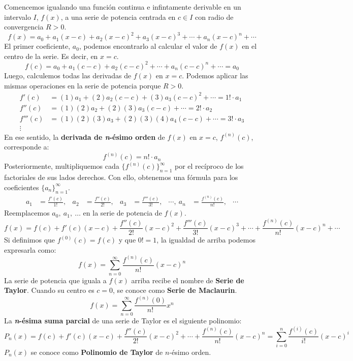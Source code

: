 \documentclass[12pt]{article}
\begin{document}
Comencemos igualando una función continua e infintamente derivable en un intervalo $I$, $f(x)$, a una serie de potencia centrada en $c \in I$ con radio de convergencia $R > 0$.
\[
  f(x) = a_{0} + a_{1}(x - c) + a_{2}(x - c)^{2} + a_{3}(x - c)^{3} + \cdots + a_{n}(x - c)^{n} + \cdots
\]
El primer coeficiente, $a_{0}$, podemos encontrarlo al calcular el valor de $f(x)$ en el centro de la serie. Es decir, en $x = c$.
\[
  f(c) = a_{0} + a_{1}(c - c) + a_{2}(c - c)^{2} + \cdots + a_{n}(c - c)^{n} + \cdots = a_{0}
\]
Luego, calculemos todas las derivadas de $f(x)$ en $x = c$. Podemos aplicar las mismas operaciones en la serie de potencia porque $R > 0$.
\begin{align*}
  f'(c) &= (1) a_{1} + (2) a_{2}(c - c) + (3) a_{3}(c - c)^{2} + \cdots = 1! \cdot a_{1} \\
  f''(c) &= (1) (2) a_{2} + (2) (3) a_{3} (c - c) + \cdots = 2! \cdot a_{2} \\
  f'''(c) &= (1) (2) (3) a_{3} + (2) (3) (4) a_{4}(c - c) + \cdots = 3! \cdot a_{3} \\
  \vdots
\end{align*}
En ese sentido, la \textbf{derivada de \textit{n}-ésimo orden} de $f(x)$ en $x = c$, $f^{(n)}(c)$, corresponde a:
\[
  f^{(n)}(c) = n! \cdot a_{n}
\]
Posteriormente, multipliquemos cada $\{f^{(n)}(c)\}_{n = 1}^{\infty}$ por el recíproco de los factoriales de sus lados derechos. Con ello, obtenemos una fórmula para los coeficientes $\{a_{n}\}_{n = 1}^{\infty}$.
\begin{align*}
  a_{1} &= \frac{f'(c)}{1!}, &
  a_{2} &= \frac{f''(c)}{2!}, &
  a_{3} &= \frac{f'''(c)}{3!}, &
  \cdots, \
  a_{n} &= \frac{f^{(n)}(c)}{n!}, &
  \cdots
\end{align*}
Reemplacemos $a_{0}, \ a_{1}, \ \ldots$ en la serie de potencia de $f(x)$.
\[
  f(x) = f(c) + f'(c)(x - c) + \frac{f''(c)}{2!}(x - c)^{2} + \frac{f'''(c)}{3!}(x - c)^{3} + \cdots
         + \frac{f^{(n)}(c)}{n!}(x - c)^{n} + \cdots
\]
Si definimos que $f^{(0)}(c) = f(c)$ y que $0! = 1$, la igualdad de arriba podemos expresarla como:
\[
  f(x) = \sum_{n = 0}^{\infty} \frac{f^{(n)}(c)}{n!}(x - c)^{n}
\]
La serie de potencia que iguala a $f(x)$ arriba recibe el nombre de \textbf{Serie de Taylor}. Cuando su centro es $c = 0$, se conoce como \textbf{Serie de Maclaurin}.
\[
  f(x) = \sum_{n = 0}^{\infty} \frac{f^{(n)}(0)}{n!} x^{n}
\]
La \textbf{\textit{n}-ésima suma parcial} de una serie de Taylor es el siguiente polinomio:
\[
  P_{n}(x) = f(c) + f'(c)(x - c) + \frac{f''(c)}{2!}(x - c)^{2} + \cdots + \frac{f^{(n)}(c)}{n!}(x - c)^{n}
           = \sum_{i = 0}^{n} \frac{f^{(i)}(c)}{i!}(x - c)^{i}
\]
$P_{n}(x)$ se conoce como \textbf{Polinomio de Taylor} de $n$-ésimo orden.
\end{document}
